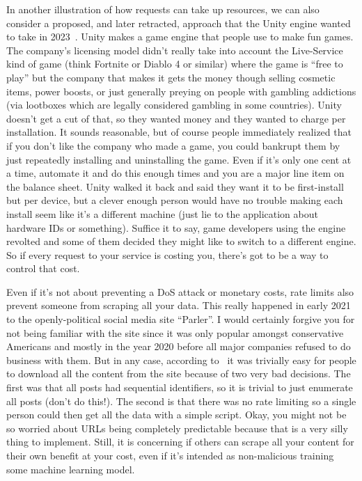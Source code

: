 In another illustration of how requests can take up resources, we can also consider a proposed, and later retracted, approach that the Unity engine wanted to take in 2023~\cite{unity}. Unity makes a game engine that people use to make fun games. The company's licensing model didn't really take into account the Live-Service kind of game (think Fortnite or Diablo 4 or similar) where the game is ``free to play'' but the company that makes it gets the money though selling cosmetic items, power boosts, or just generally preying on people with gambling addictions (via lootboxes which are legally considered gambling in some countries). Unity doesn't get a cut of that, so they wanted money and they wanted to charge per installation. It sounds reasonable, but of course people immediately realized that if you don't like the company who made a game, you could bankrupt them by just repeatedly installing and uninstalling the game. Even if it's only one cent at a time, automate it and do this enough times and you are a major line item on the balance sheet. Unity walked it back and said they want it to be first-install but per device, but a clever enough person would have no trouble making each install seem like it's a different machine (just lie to the application about hardware IDs or something). Suffice it to say, game developers using the engine revolted and some of them decided they might like to switch to a different engine. So if every request to your service is costing you, there's got to be a way to control that cost.


Even if it's not about preventing a DoS attack or monetary costs, rate limits also prevent someone from scraping all your data. This really happened in early 2021 to the openly-political social media site ``Parler''. I would certainly forgive you for not being familiar with the site since it was only popular amongst conservative Americans and mostly in the year 2020 before all major companies refused to do business with them. But in any case, according to~\cite{parler} it was trivially easy for people to download all the content from the site because of two very bad decisions. The first was that all posts had sequential identifiers, so it is trivial to just enumerate all posts (don't do this!). The second is that there was no rate limiting so a single person could then get all the data with a simple script. Okay, you might not be so worried about URLs being completely predictable because that is a very silly thing to implement. Still, it is concerning if others can scrape all your content for their own benefit at your cost, even if it's intended as non-malicious training some machine learning model. 


